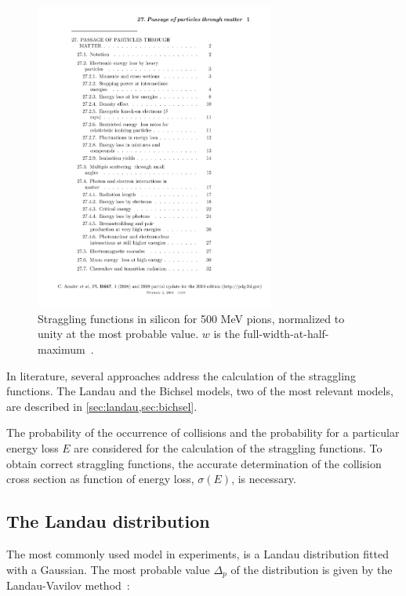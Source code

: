 \begin{figure}[htbp]
  \centering
  \includegraphics[width=0.7\textwidth, page=14, trim = 50mm 160mm
    40mm 20mm, clip]{Articles/rpp2009-rev-passage-particles-matter.pdf}
  \caption{Straggling functions in silicon for 500 MeV pions,
    normalized to unity at the most probable value. $w$
    is the full-width-at-half-maximum~\cite{Beringer:1900zz}.}
  \label{fig:LandauDistribution}
\end{figure}

In literature, several approaches address the calculation of the
straggling functions. The Landau and the Bichsel models, two of the
most relevant models, are described in \cref{sec:landau,sec:bichsel}. 

The probability of the occurrence of collisions and the probability
for a particular energy loss $E$ are considered for the calculation of
the straggling functions. To obtain correct straggling functions, the
accurate determination of the collision cross section as function of
energy loss, $\sigma(E)$, is necessary.

\subsection{The Landau distribution}\label{sec:landau}
The most commonly used model in experiments, is a Landau distribution
fitted with a Gaussian. The most probable value $\Delta_p$ of the
distribution is given by the Landau-Vavilov
method~\cite{Landau:1944if,Vavilov:1957zz}:

